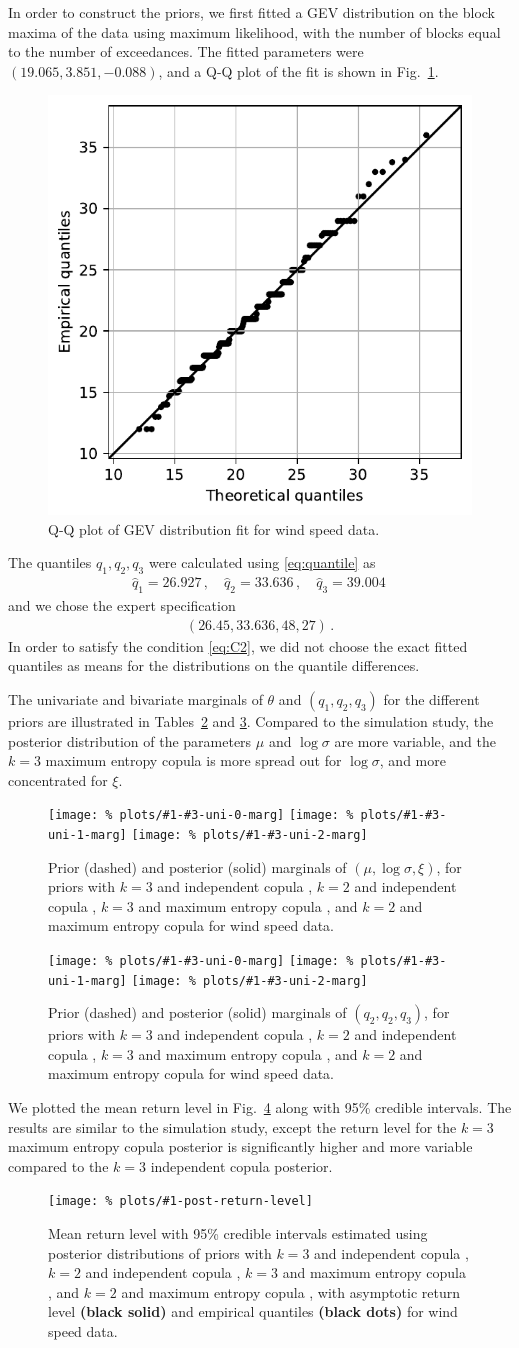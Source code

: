 \documentclass{article}
\newcommand{\marginals}[6]{
	\begin{figure}
		\centering
		\texttt{[image: \%
						plots/\#1-\#3-uni-0-marg]}
		\texttt{[image: \%
						plots/\#1-\#3-uni-1-marg]}
		\texttt{[image: \%
						plots/\#1-\#3-uni-2-marg]}
		\caption{Prior (dashed) and posterior (solid) marginals of
			$(#4, #5, #6)$, for priors with
			$k = 3$ and independent copula \textbf{\color{blue}{(blue)}},
			$k = 2$ and independent copula \textbf{\color{green}{(green)}},
			$k = 3$ and maximum entropy copula
			\textbf{\color{orange}{(orange)}}, and
			$k = 2$ and maximum entropy copula \textbf{\color{red}{(red)}}
			for #2.}
		\label{table:#1-#3-uni-marg}
	\end{figure}
}
\newcommand{\allmarginals}[2]{
	\marginals{#1}{#2}{theta}{\mu}{\log\sigma}{\xi}
	\marginals{#1}{#2}{q}{q_2}{q_2}{q_3}
}
\newcommand{\allreturnlevels}[2]{
	\begin{figure}
		\centering
		\texttt{[image: \%
						plots/\#1-post-return-level]}
		\caption{Mean return level with 95\% credible intervals
			estimated using posterior distributions of priors with
			$k = 3$ and independent copula \textbf{\color{blue}{(blue)}},
			$k = 2$ and independent copula \textbf{\color{green}{(green)}},
			$k = 3$ and maximum entropy copula
			\textbf{\color{orange}{(orange)}}, and
			$k = 2$ and maximum entropy copula \textbf{\color{red}{(red)}},
			with asymptotic return level {\color{black} \textbf{(black solid)}}
			and empirical quantiles {\color{black} \textbf{(black dots)}}
			for #2.}
		\label{table:#1-post-return-level}
	\end{figure}
}
\begin{document}
%
In order to construct the priors,
we first fitted a GEV distribution on the block maxima of the data
using maximum likelihood,
with the number of blocks equal to the number of exceedances.
The fitted parameters were
$(19.065, 3.851, -0.088)$, and
a Q-Q plot of the fit is shown in Fig.~\ref{fig:ws-qq}.
%
\begin{figure}
	\centering
	\includegraphics[width=0.55\linewidth]{plots/ws-qq.pdf}
	\caption{Q-Q plot of GEV distribution fit for wind speed data.}
	\label{fig:ws-qq}
\end{figure}
%
The quantiles $q_1, q_2, q_3$ were calculated
using \eqref{eq:quantile} as
%
\begin{align*}
	\hat{q}_1 = 26.927 \,,
	\quad \hat{q}_2 = 33.636 \,,
	\quad \hat{q}_3 = 39.004 \,
\end{align*}
%
and we chose the expert specification
%
\begin{align*}
	\left(26.45, 33.636, 48, 27 \right) \,.
\end{align*}
%
In order to satisfy the condition \eqref{eq:C2},
we did not choose the exact fitted quantiles
as means for the distributions on the quantile differences.

%
The univariate and bivariate marginals of
$\theta$ and $(q_1, q_2, q_3)$ for the different priors are illustrated
in Tables~\ref{table:ws-theta-uni-marg} and \ref{table:ws-q-uni-marg}.
Compared to the simulation study, the posterior distribution of the
parameters $\mu$ and $\log\sigma$ are more variable,
and the
$k = 3$ maximum entropy copula is more spread out for $\log\sigma$,
and more concentrated for $\xi$.
%
\allmarginals{ws}{wind speed data}
%

%
We plotted the mean return level in Fig.~\ref{table:ws-post-return-level}
along with 95\% credible intervals. The results are similar
to the simulation study, except the return level for the
$k = 3$ maximum entropy copula posterior
is significantly higher and more variable compared
to the $k = 3$ independent copula posterior.
%
\allreturnlevels{ws}{wind speed data}
%
\FloatBarrier
%
\end{document}
